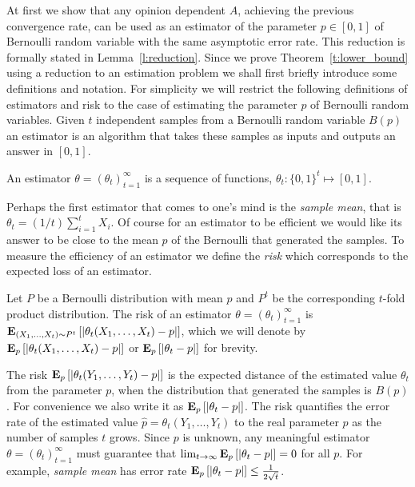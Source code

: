 At first we show that any opinion dependent $A$, achieving the previous
convergence rate, can be used as an estimator of the parameter
$p \in [0,1] $ of Bernoulli random variable with the same asymptotic error
rate. This reduction is formally stated in Lemma~\ref{l:reduction}.
Since we prove Theorem~\ref{t:lower_bound} using a reduction to
an estimation problem we shall first briefly introduce some definitions and
notation. For simplicity we will restrict the following definitions
of estimators and risk to the case of estimating the parameter $p$ of Bernoulli
random variables.
Given $t$ independent samples from a Bernoulli random variable $B(p)$
an estimator is an algorithm that takes these samples as inputs and
outputs an answer in $[0,1]$.
\begin{definition}\label{d:estimator}
  An estimator $\theta=(\theta_t)_{t=1}^{\infty}$
  is a sequence of functions, $\theta_t: \{0,1\}^t\mapsto [0,1]$.
\end{definition}
Perhaps the first estimator that comes to one's mind is the
\emph{sample mean}, that is $\theta_t=(1/t) \sum_{i=1}^t X_i$.
Of course for an estimator to be efficient we would like its answer to be
close to the mean $p$ of the Bernoulli that generated the samples.
To measure the efficiency of an estimator we define the \emph{risk}
which corresponds to the expected loss of an estimator.
\begin{definition}\label{d:risk}
  Let $P$ be a Bernoulli distribution with mean $p$ and
  $P^t$ be the corresponding $t$-fold product distribution.
  The risk of an estimator $\theta =(\theta_t)_{t=1}^\infty$ is
  $\bm{\mathrm{E}}_{(X_1,\ldots,X_t) \sim P^t} \left[ |\theta_t(X_1,\ldots,X_t) - p| \right]$,
  which we will denote by
  $\bm{\mathrm{E}}_{p} \left[ |\theta_t(X_1,\ldots,X_t) - p| \right]$ or
  $\bm{\mathrm{E}}_{p} \left[ |\theta_t - p| \right]$ for brevity.
\end{definition}
The risk $\bm{\mathrm{E}}_{p} \left[ |\theta_t(Y_1,\ldots,Y_t) - p| \right]$ is the expected distance
of the estimated value $\theta_t$ from the parameter $p$, when the
distribution that generated the samples is $B(p)$.
For convenience we also write it as $\bm{\mathrm{E}}_{p} \left[ |\theta_t - p| \right]$.
The risk quantifies the error rate of
the estimated value $\hat{p} =\theta_t(Y_1,\ldots,Y_t)$ to the
real parameter $p$ as the number of samples $t$ grows.
Since $p$ is unknown, any meaningful estimator $\theta=(\theta_t)_{t=1}^\infty$
must guarantee that $\lim_{t \to \infty} \bm{\mathrm{E}}_{p} \left[ |\theta_t - p| \right]=0$ for all $p$.
For example, \emph{sample mean} has error rate
$\bm{\mathrm{E}}_{p} \left[ |\theta_t-p| \right] \leq \frac{1}{2\sqrt{t}}$.

